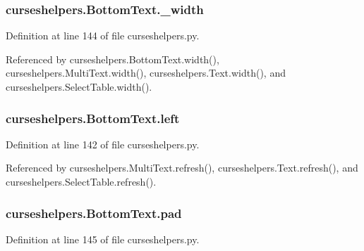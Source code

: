 \subsubsection[{\-\_\-width}]{\setlength{\rightskip}{0pt plus 5cm}curseshelpers.\-Bottom\-Text.\-\_\-width\hspace{0.3cm}{\ttfamily [private]}}\label{classcurseshelpers_1_1BottomText_a22c8129ddd60f67b86d65ebd59b029d7}


Definition at line 144 of file curseshelpers.\-py.



Referenced by curseshelpers.\-Bottom\-Text.\-width(), curseshelpers.\-Multi\-Text.\-width(), curseshelpers.\-Text.\-width(), and curseshelpers.\-Select\-Table.\-width().

\subsubsection[{left}]{\setlength{\rightskip}{0pt plus 5cm}curseshelpers.\-Bottom\-Text.\-left}\label{classcurseshelpers_1_1BottomText_aaed677fda789c4786cb83e2ec037cbc7}


Definition at line 142 of file curseshelpers.\-py.



Referenced by curseshelpers.\-Multi\-Text.\-refresh(), curseshelpers.\-Text.\-refresh(), and curseshelpers.\-Select\-Table.\-refresh().

\subsubsection[{pad}]{\setlength{\rightskip}{0pt plus 5cm}curseshelpers.\-Bottom\-Text.\-pad}\label{classcurseshelpers_1_1BottomText_ab8cae6016b0cc80187f438894b3dd60a}


Definition at line 145 of file curseshelpers.\-py.

